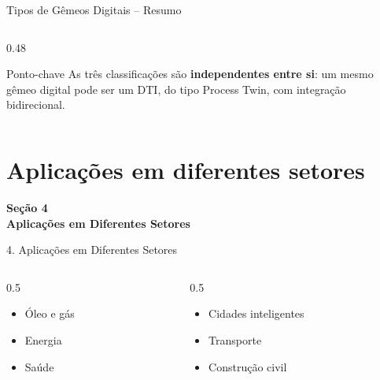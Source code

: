 \documentclass[aspectratio=169,xcolor=dvipsnames]{beamer}
\begin{document}
\begin{frame}{Tipos de Gêmeos Digitais -- Resumo}
\begin{columns}[T]
\begin{column}{0.48\textwidth}
            \vspace{0.2em}
            \begin{alertblock}{Ponto-chave}
                \footnotesize
                As três classificações são \textbf{independentes entre si}: um mesmo gêmeo digital pode ser um DTI, do tipo Process Twin, com integração bidirecional.
            \end{alertblock}
        \end{column}
    \end{columns}
\end{frame}

\section{Aplicações em diferentes setores}

\begin{frame}[plain]
    \vfill
    \centering
    {\Large\textcolor{dexpiBlue}{\textbf{Seção 4}}}\\[0.8em]
    {\LARGE\textbf{Aplicações em Diferentes Setores}}\\[0.6em]
    \vfill
\end{frame}

\begin{frame}{4. Aplicações em Diferentes Setores}
    \begin{columns}[T]
        \begin{column}{0.5\textwidth}
            \begin{itemize}
                \item Óleo e gás
                \item Energia
                \item Saúde

            \end{itemize}
        \end{column}
        \begin{column}{0.5\textwidth}
            \begin{itemize}
                \item Cidades inteligentes
                \item Transporte
                \item Construção civil
            \end{itemize}
        \end{column}
    \end{columns}
    \vfill
\end{frame}
\end{document}
